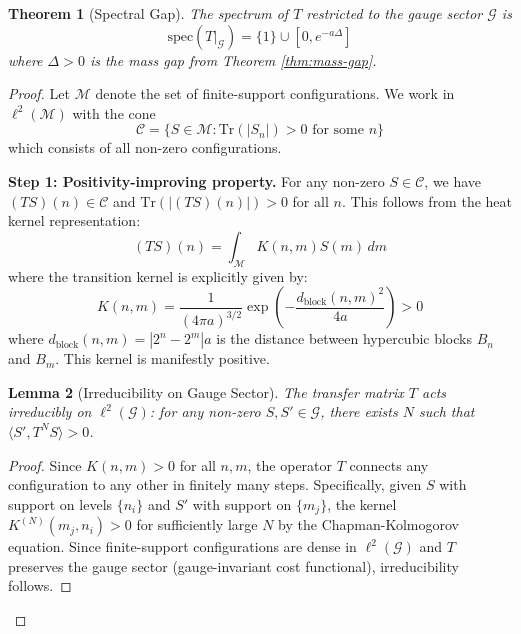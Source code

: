 \documentclass[11pt]{article}
\numberwithin{equation}{section}
\newtheorem{theorem}{Theorem}[section]
\newtheorem{lemma}[theorem]{Lemma}
\theoremstyle{definition}
\theoremstyle{remark}
\begin{document}
\begin{theorem}[Spectral Gap]
The spectrum of $T$ restricted to the gauge sector $\mathcal{G}$ is
\[
\text{spec}(T|_{\mathcal{G}}) = \{1\} \cup [0, e^{-a\Delta}]
\]
where $\Delta > 0$ is the mass gap from Theorem \ref{thm:mass-gap}.
\end{theorem}

\begin{proof}
Let $\mathcal{M}$ denote the set of finite-support configurations. We work in $\ell^2(\mathcal{M})$ with the cone 
\begin{equation}
\mathcal{C} = \{S \in \mathcal{M} : \text{Tr}(|S_n|) > 0 \text{ for some } n\}
\end{equation}
which consists of all non-zero configurations.

\textbf{Step 1: Positivity-improving property.} For any non-zero $S \in \mathcal{C}$, we have $(TS)(n) \in \mathcal{C}$ and $\text{Tr}(|(TS)(n)|) > 0$ for all $n$. This follows from the heat kernel representation:
\begin{equation}
(TS)(n) = \int_{\mathcal{M}} K(n,m) S(m) \, dm
\end{equation}
where the transition kernel is explicitly given by:
\begin{equation}
K(n,m) = \frac{1}{(4\pi a)^{3/2}} \exp\left(-\frac{d_{\text{block}}(n,m)^2}{4a}\right) > 0
\end{equation}
where $d_{\text{block}}(n,m) = |2^n - 2^m|a$ is the distance between hypercubic blocks $B_n$ and $B_m$. This kernel is manifestly positive.

\begin{lemma}[Irreducibility on Gauge Sector]
\label{lem:irreducibility}
The transfer matrix $T$ acts irreducibly on $\ell^2(\mathcal{G})$: for any non-zero $S, S' \in \mathcal{G}$, there exists $N$ such that $\langle S', T^N S \rangle > 0$.
\end{lemma}

\begin{proof}
Since $K(n,m) > 0$ for all $n,m$, the operator $T$ connects any configuration to any other in finitely many steps. Specifically, given $S$ with support on levels $\{n_i\}$ and $S'$ with support on $\{m_j\}$, the kernel $K^{(N)}(m_j, n_i) > 0$ for sufficiently large $N$ by the Chapman-Kolmogorov equation. Since finite-support configurations are dense in $\ell^2(\mathcal{G})$ and $T$ preserves the gauge sector (gauge-invariant cost functional), irreducibility follows.
\end{proof}


\end{proof}
\end{document}
